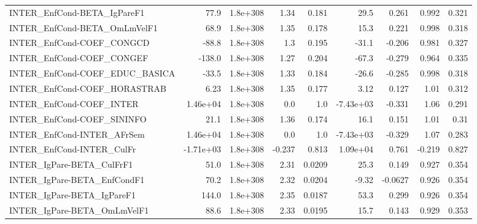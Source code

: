 \begin{tabular}{lrrrrrrrr}
INTER\_EnfCond-BETA\_IgPareF1           &        77.9 &     1.8e+308 &    1.34 &    0.181 &       29.5 &       0.261 &        0.992 &         0.321 \\
INTER\_EnfCond-BETA\_OmLmVelF1          &        68.9 &     1.8e+308 &    1.35 &    0.178 &       15.3 &       0.221 &        0.998 &         0.318 \\
INTER\_EnfCond-COEF\_CONGCD             &       -88.8 &     1.8e+308 &     1.3 &    0.195 &      -31.1 &      -0.206 &        0.981 &         0.327 \\
INTER\_EnfCond-COEF\_CONGEF             &      -138.0 &     1.8e+308 &    1.27 &    0.204 &      -67.3 &      -0.279 &        0.964 &         0.335 \\
INTER\_EnfCond-COEF\_EDUC\_BASICA        &       -33.5 &     1.8e+308 &    1.33 &    0.184 &      -26.6 &      -0.285 &        0.998 &         0.318 \\
INTER\_EnfCond-COEF\_HORASTRAB          &        6.23 &     1.8e+308 &    1.35 &    0.177 &       3.12 &       0.127 &         1.01 &         0.312 \\
INTER\_EnfCond-COEF\_INTER              &    1.46e+04 &     1.8e+308 &     0.0 &      1.0 &  -7.43e+03 &      -0.331 &         1.06 &         0.291 \\
INTER\_EnfCond-COEF\_SININFO            &        21.1 &     1.8e+308 &    1.36 &    0.174 &       16.1 &       0.151 &         1.01 &          0.31 \\
INTER\_EnfCond-INTER\_AFrSem            &    1.46e+04 &     1.8e+308 &     0.0 &      1.0 &  -7.43e+03 &      -0.329 &         1.07 &         0.283 \\
INTER\_EnfCond-INTER\_CulFr             &   -1.71e+03 &     1.8e+308 &  -0.237 &    0.813 &   1.09e+04 &       0.761 &       -0.219 &         0.827 \\
INTER\_IgPare-BETA\_CulFrF1             &        51.0 &     1.8e+308 &    2.31 &   0.0209 &       25.3 &       0.149 &        0.927 &         0.354 \\
INTER\_IgPare-BETA\_EnfCondF1           &        70.2 &     1.8e+308 &    2.32 &   0.0204 &      -9.32 &     -0.0627 &        0.926 &         0.354 \\
INTER\_IgPare-BETA\_IgPareF1            &       144.0 &     1.8e+308 &    2.35 &   0.0187 &       53.3 &       0.299 &        0.926 &         0.354 \\
INTER\_IgPare-BETA\_OmLmVelF1           &        88.6 &     1.8e+308 &    2.33 &   0.0195 &       15.7 &       0.143 &        0.929 &         0.353 \\

\end{tabular}
